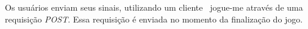 


Os usuários enviam seus sinais, utilizando um cliente ~\ac{jogue-me} através de uma requisição \textit{POST}. Essa requisição é enviada no momento da finalização do jogo.
% 
% 		
% 		
% 
% 		


